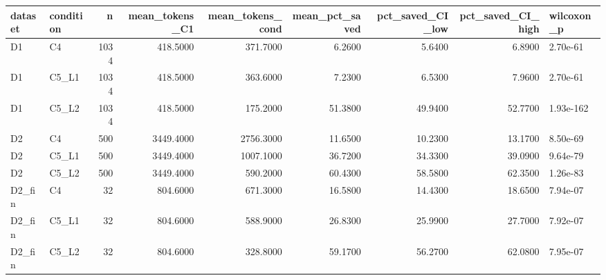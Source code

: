 \begin{tabular}{llrrrrrrl}
\toprule
dataset & condition & n & mean\_tokens\_C1 & mean\_tokens\_cond & mean\_pct\_saved & pct\_saved\_CI\_low & pct\_saved\_CI\_high & wilcoxon\_p \\
\midrule
D1 & C4 & 1034 & 418.5000 & 371.7000 & 6.2600 & 5.6400 & 6.8900 & 2.70e-61 \\
D1 & C5\_L1 & 1034 & 418.5000 & 363.6000 & 7.2300 & 6.5300 & 7.9600 & 2.70e-61 \\
D1 & C5\_L2 & 1034 & 418.5000 & 175.2000 & 51.3800 & 49.9400 & 52.7700 & 1.93e-162 \\
D2 & C4 & 500 & 3449.4000 & 2756.3000 & 11.6500 & 10.2300 & 13.1700 & 8.50e-69 \\
D2 & C5\_L1 & 500 & 3449.4000 & 1007.1000 & 36.7200 & 34.3300 & 39.0900 & 9.64e-79 \\
D2 & C5\_L2 & 500 & 3449.4000 & 590.2000 & 60.4300 & 58.5800 & 62.3500 & 1.26e-83 \\
D2\_fin & C4 & 32 & 804.6000 & 671.3000 & 16.5800 & 14.4300 & 18.6500 & 7.94e-07 \\
D2\_fin & C5\_L1 & 32 & 804.6000 & 588.9000 & 26.8300 & 25.9900 & 27.7000 & 7.92e-07 \\
D2\_fin & C5\_L2 & 32 & 804.6000 & 328.8000 & 59.1700 & 56.2700 & 62.0800 & 7.95e-07 \\
\bottomrule
\end{tabular}

